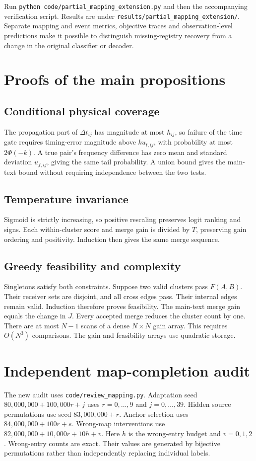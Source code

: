 \documentclass[10pt,a4paper]{article}
\begin{document}
Run \texttt{python code/partial\_mapping\_extension.py} and then the accompanying verification script. Results are under \texttt{results/partial\_mapping\_extension/}. Separate mapping and event metrics, objective traces and observation-level predictions make it possible to distinguish missing-registry recovery from a change in the original classifier or decoder.




\section{Proofs of the main propositions}
\subsection{Conditional physical coverage}
The propagation part of $\Delta t_{ij}$ has magnitude at most $h_{ij}$, so failure of the time gate requires timing-error magnitude above $ku_{t,ij}$, with probability at most $2\Phi(-k)$. A true pair's frequency difference has zero mean and standard deviation $u_{f,ij}$, giving the same tail probability. A union bound gives the main-text bound without requiring independence between the two tests.
\subsection{Temperature invariance}
Sigmoid is strictly increasing, so positive rescaling preserves logit ranking and signs. Each within-cluster score and merge gain is divided by $T$, preserving gain ordering and positivity. Induction then gives the same merge sequence.
\subsection{Greedy feasibility and complexity}
Singletons satisfy both constraints. Suppose two valid clusters pass $F(A,B)$. Their receiver sets are disjoint, and all cross edges pass. Their internal edges remain valid. Induction therefore proves feasibility. The main-text merge gain equals the change in $J$. Every accepted merge reduces the cluster count by one. There are at most $N-1$ scans of a dense $N\times N$ gain array. This requires $O(N^3)$ comparisons. The gain and feasibility arrays use quadratic storage.

\section{Independent map-completion audit}
The new audit uses \texttt{code/review\_mapping.py}. Adaptation seed $80{,}000{,}000+100{,}000r+j$ uses $r=0,\ldots,9$ and $j=0,\ldots,39$. Hidden source permutations use seed $83{,}000{,}000+r$. Anchor selection uses $84{,}000{,}000+100r+s$. Wrong-map interventions use $82{,}000{,}000+10{,}000r+10h+v$. Here $h$ is the wrong-entry budget and $v=0,1,2$. Wrong-entry counts are exact. Their values are generated by bijective permutations rather than independently replacing individual labels.
\end{document}
